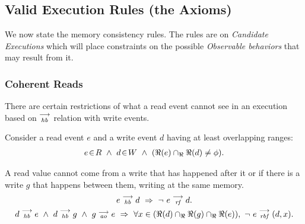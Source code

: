 
    \subsection{Valid Execution Rules (the Axioms)}
        We now state the memory consistency rules. The rules are on \textit{Candidate Executions} which will place constraints on the possible \textit{Observable behaviors} that may result from it.
         
        \subsubsection{Coherent Reads} 
        
            There are certain restrictions of what a read event cannot see in an execution based on $\stackrel{\longrightarrow}{_\textit{hb}}$ relation with write events.
            
            Consider a read event $e$ and a write event $d$ having at least overlapping ranges:
            \begin{align*}
                \event{e}{R} \ \wedge \ 
                \event{d}{W} \ \wedge \
                (\Re(e) \cap_\Re \Re(d) \neq \phi).
            \end{align*}
            
            A read value cannot come from a write that has happened after it or if there is a write $g$ that happens between them, writing at the same memory.     \begin{gather*}
                    \reln{e}{hb}{d}\ \Rightarrow{}\ \neg \ \reln{e}{rf}{d}. \\
                    \reln{d}{hb}{e}
                    \ \wedge \ 
                    \reln{d}{hb}{g} \ \wedge \  \reln{g}{ao}{e}
                    \ \Rightarrow{} \
                    \forall x \in (\Re(d) \cap_\Re \Re(g) \cap_\Re \Re(e)), \ \neg \ \reln{e}{rbf}{(d,x)}.
                \end{gather*}
     
